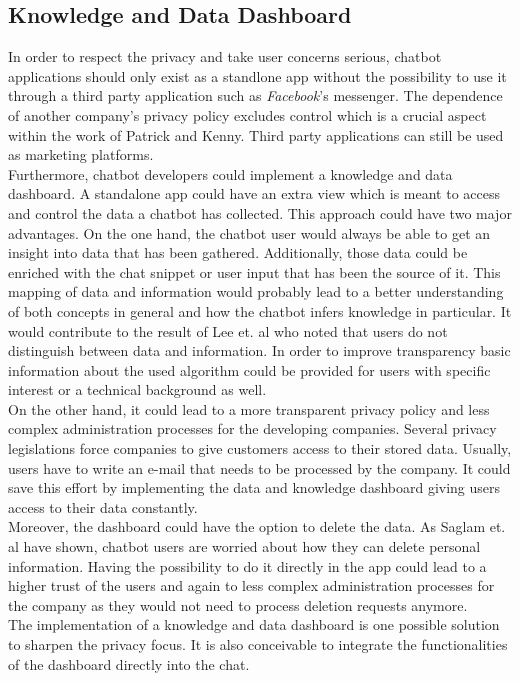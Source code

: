 \documentclass[sigconf, nonacm]{acmart}
\begin{document}
\subsection{Knowledge and Data Dashboard}
In order to respect the privacy and take user concerns serious, chatbot applications should only exist as a standlone app without the possibility to use it through a third party application such as \emph{Facebook}'s messenger. The dependence of another company's privacy policy excludes control which is a crucial aspect within the 
work of Patrick and Kenny\cite{Patrick2003}. Third party applications can still be used as marketing platforms.
\\
Furthermore, chatbot developers could implement a knowledge and data dashboard. A standalone app could have an extra view which is meant to access and control the data a chatbot has collected.
This approach could have two major advantages. On the one hand, the chatbot user would always be able to get an insight into data that has been gathered. Additionally, those data could be enriched with the chat snippet or user input that has been the source of it. 
This mapping of data and information would probably lead to a better understanding of both concepts in general and how the chatbot infers knowledge in particular. It would contribute to the result of Lee et. al \cite{Lee2011} who noted that users do not distinguish between data and information.
In order to improve transparency basic information about the used algorithm could be provided for users with specific interest or a technical background as well.
\\
On the other hand, it could lead to a more transparent privacy policy and less complex administration processes for the developing companies. Several privacy legislations force companies to give customers access to their stored data. Usually, users have to write an e-mail that needs to be processed by the company. It could save this effort by
implementing the data and knowledge dashboard giving users access to their data constantly.
\\
Moreover, the dashboard could have the option to delete the data. As Saglam et. al \cite{Shamim2021} have shown, chatbot users are worried about how they can delete personal information. Having the possibility to do it directly in the app could lead to a higher trust of the users and again to less complex administration processes for the company
as they would not need to process deletion requests anymore.
\\
The implementation of a knowledge and data dashboard is one possible solution to sharpen the privacy focus. It is also conceivable to integrate the functionalities of the dashboard directly into the chat.
\end{document}

